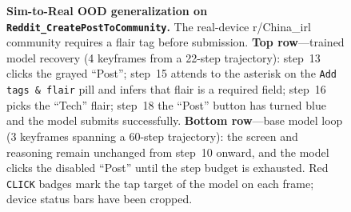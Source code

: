 \documentclass{llmxive}
\begin{document}
\begin{figure}[t]
  \caption{\textbf{Sim-to-Real OOD generalization on \texttt{Reddit\_CreatePostToCommunity}.} The real-device r/China\_irl community requires a flair tag before submission. \textbf{Top row}---trained model recovery (4 keyframes from a 22-step trajectory): step~13 clicks the grayed ``Post''; step~15 attends to the asterisk on the \texttt{Add tags \& flair} pill and infers that flair is a required field; step~16 picks the ``Tech'' flair; step~18 the ``Post'' button has turned blue and the model submits successfully. \textbf{Bottom row}---base model loop (3 keyframes spanning a 60-step trajectory): the screen and reasoning remain unchanged from step~10 onward, and the model clicks the disabled ``Post'' until the step budget is exhausted. Red \texttt{CLICK} badges mark the tap target of the model on each frame; device status bars have been cropped.}
  \label{fig:reddit-case}
\end{figure}
\end{document}
